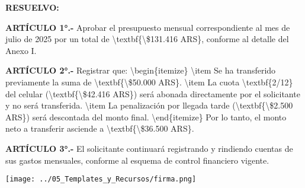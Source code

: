 \documentclass[12pt]{article}
\begin{document}
\textbf{RESUELVO:}

\textbf{ARTÍCULO 1°.-}
Aprobar el presupuesto mensual correspondiente al mes de julio de 2025 por un total de \textbackslash{}textbf\{\textbackslash{}\$131.416 ARS\}, conforme al detalle del Anexo I.
\vspace{0.5cm}

\textbf{ARTÍCULO 2°.-}
Registrar que: \textbackslash{}begin\{itemize\} \textbackslash{}item Se ha transferido previamente la suma de \textbackslash{}textbf\{\textbackslash{}\$50.000 ARS\}. \textbackslash{}item La cuota \textbackslash{}textbf\{2/12\} del celular (\textbackslash{}textbf\{\textbackslash{}\$42.416 ARS\}) será abonada directamente por el solicitante y no será transferida. \textbackslash{}item La penalización por llegada tarde (\textbackslash{}textbf\{\textbackslash{}\$2.500 ARS\}) será descontada del monto final. \textbackslash{}end\{itemize\} Por lo tanto, el monto neto a transferir asciende a \textbackslash{}textbf\{\textbackslash{}\$36.500 ARS\}.
\vspace{0.5cm}

\textbf{ARTÍCULO 3°.-}
El solicitante continuará registrando y rindiendo cuentas de sus gastos mensuales, conforme al esquema de control financiero vigente.
\vspace{0.5cm}


\vspace{1.4cm}

\begin{flushright}
  \texttt{[image: ../05\_Templates\_y\_Recursos/firma.png]}
\end{flushright}

\end{document}

